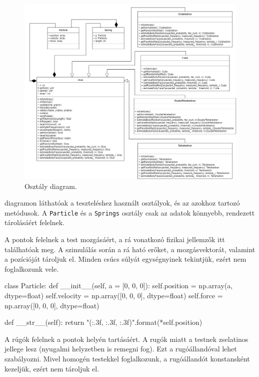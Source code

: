 \begin{figure}[h!]
	\centering
	\includegraphics[width=\textwidth]{images/uml.png}
	\caption{Osztály diagram.}
	\label{fig:uml}
\end{figure}

 diagramon láthatóak a teszteléshez használt osztályok, és az azokhoz tartozó metódusok.
A \texttt{Particle} és a \texttt{Springs} osztály csak az adatok könnyebb, rendezett tárolásáért felelnek.


A pontok felelnek a test mozgásáért, a rá vonatkozó fizikai jellemzők itt találhatóak meg.
A szimulálás során a rá ható erőket, a mozgásvektorát, valamint a pozícióját tároljuk el.
Minden csúcs súlyát egységnyinek tekintjük, ezért nem foglalkozunk vele.

\begin{python}
class Particle:
    def __init__(self, a = [0, 0, 0]):
        self.position = np.array(a, dtype=float) 
        self.velocity = np.array([0, 0, 0], dtype=float)
        self.force = np.array([0, 0, 0], dtype=float)

    def __str__(self):
        return "({:.3f}, {:.3f}, {:.3f})".format(*self.position)
\end{python}


A rúgók felelnek a pontok helyén tartásáért.
A rugók miatt a testnek zselatinos jellege lesz (nyugalmi helyzetben is remegni fog).
Ezt a rugóállandóval lehet szabályozni.
Mivel homogén testekkel foglalkozunk, a rugóállandót konstansként kezeljük, ezért nem tároljuk el.

